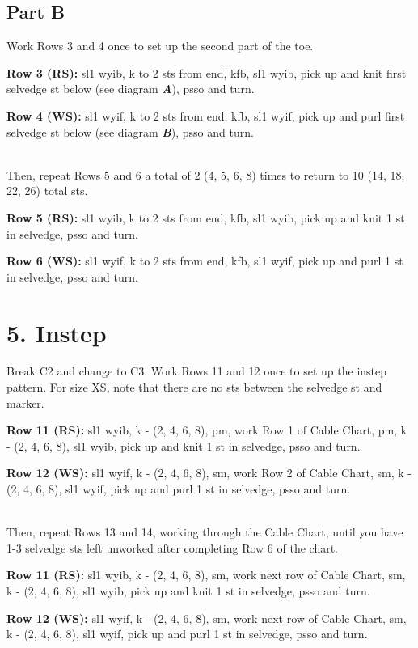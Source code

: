 \documentclass[12pt]{article}
\newcommand{\vocab}[1]{\emph{\textbf{#1}}} %
\newcommand{\rowDir}[1]{\textbf{#1:}} %
\begin{document}
\subsection*{Part B}
Work Rows 3 and 4 once to set up the second part of the toe.

\rowDir{Row 3 (RS)}  sl1 wyib, k to 2 sts from end, kfb, sl1 wyib, pick up and knit first selvedge st below (see diagram \vocab{A}), psso and turn.

\rowDir{Row 4 (WS)} sl1 wyif, k to 2 sts from end, kfb, sl1 wyif, pick up and purl first selvedge st below (see diagram \vocab{B}), psso and turn.

~\\
Then, repeat Rows 5 and 6 a total of 2 (4, 5, 6, 8) times to return to 10 (14, 18, 22, 26) total sts.

\rowDir{Row 5 (RS)} sl1 wyib, k to 2 sts from end, kfb, sl1 wyib, pick up and knit 1 st in selvedge, psso and turn.

\rowDir{Row 6 (WS)} sl1 wyif, k to 2 sts from end, kfb, sl1 wyif, pick up and purl 1 st in selvedge, psso and turn.

\section*{5. Instep}

Break C2 and change to C3. Work Rows 11 and 12 once to set up the instep pattern. For size XS, note that there are no sts between the selvedge st and marker. 

\rowDir{Row 11 (RS)} sl1 wyib, k - (2, 4, 6, 8), pm, work Row 1 of Cable Chart, pm, k - (2, 4, 6, 8), sl1 wyib, pick up and knit 1 st in selvedge, psso and turn.

\rowDir{Row 12 (WS)} sl1 wyif, k - (2, 4, 6, 8), sm, work Row 2 of Cable Chart, sm, k - (2, 4, 6, 8), sl1 wyif, pick up and purl 1 st in selvedge, psso and turn.

~\\
Then, repeat Rows 13 and 14, working through the Cable Chart, until you have 1-3 selvedge sts left unworked after completing Row 6 of the chart. 

\rowDir{Row 11 (RS)} sl1 wyib, k - (2, 4, 6, 8), sm, work next row of Cable Chart, sm, k - (2, 4, 6, 8), sl1 wyib, pick up and knit 1 st in selvedge, psso and turn.

\rowDir{Row 12 (WS)} sl1 wyif, k - (2, 4, 6, 8), sm, work next row of Cable Chart, sm, k - (2, 4, 6, 8), sl1 wyif, pick up and purl 1 st in selvedge, psso and turn.
\end{document}
